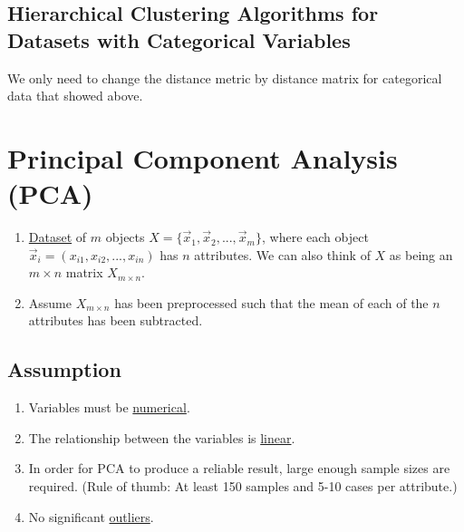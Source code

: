 \documentclass[11pt]{elegantbook}
\begin{document}
\section{Hierarchical Clustering Algorithms for Datasets with Categorical Variables}
We only need to change the distance metric by distance matrix for categorical data that showed above.


\chapter{Principal Component Analysis (PCA)}
\begin{enumerate}[$\bullet$]
    \item \underline{Dataset} of $m$ objects $X=\{\vec{x}_1,\vec{x}_2,...,\vec{x}_m\}$, where each object $\vec{x}_i=(x_{i1},x_{i2},...,x_{in})$ has $n$ attributes. We can also think of $X$ as being an $m\times n$ matrix $X_{m\times n}$.
    \item Assume $X_{m\times n}$ has been preprocessed such that the mean of each of the $n$ attributes has been subtracted.
\end{enumerate}
\section{Assumption}
\begin{enumerate}
    \item Variables must be \underline{numerical}.
    \item The relationship between the variables is \underline{linear}.
    \item In order for PCA to produce a reliable result, large enough sample sizes are required. (Rule of thumb: At least 150 samples and 5-10 cases per attribute.)
    \item No significant \underline{outliers}.
\end{enumerate}
\end{document}

